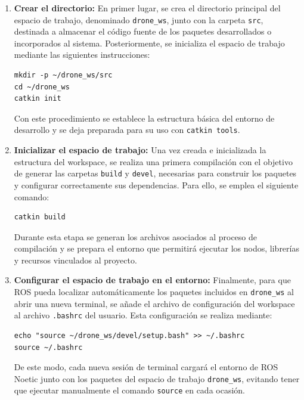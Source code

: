 \begin{enumerate}
    \item \textbf{Crear el directorio:} En primer lugar, se crea el directorio principal del espacio de trabajo, denominado \texttt{drone\_ws}, junto con la carpeta \texttt{src}, destinada a almacenar el código fuente de los paquetes desarrollados o incorporados al sistema. Posteriormente, se inicializa el espacio de trabajo mediante las siguientes instrucciones:

\begin{verbatim}
mkdir -p ~/drone_ws/src
cd ~/drone_ws
catkin init
\end{verbatim}

    Con este procedimiento se establece la estructura básica del entorno de desarrollo y se deja preparada para su uso con \texttt{catkin tools}.

    \item \textbf{Inicializar el espacio de trabajo:} Una vez creada e inicializada la estructura del workspace, se realiza una primera compilación con el objetivo de generar las carpetas \texttt{build} y \texttt{devel}, necesarias para construir los paquetes y configurar correctamente sus dependencias. Para ello, se emplea el siguiente comando:

\begin{verbatim}
catkin build
\end{verbatim}

    Durante esta etapa se generan los archivos asociados al proceso de compilación y se prepara el entorno que permitirá ejecutar los nodos, librerías y recursos vinculados al proyecto.

    \item \textbf{Configurar el espacio de trabajo en el entorno:} Finalmente, para que ROS pueda localizar automáticamente los paquetes incluidos en \texttt{drone\_ws} al abrir una nueva terminal, se añade el archivo de configuración del workspace al archivo \texttt{.bashrc} del usuario. Esta configuración se realiza mediante:

\begin{verbatim}
echo "source ~/drone_ws/devel/setup.bash" >> ~/.bashrc
source ~/.bashrc
\end{verbatim}

    De este modo, cada nueva sesión de terminal cargará el entorno de ROS Noetic junto con los paquetes del espacio de trabajo \texttt{drone\_ws}, evitando tener que ejecutar manualmente el comando \texttt{source} en cada ocasión.

\end{enumerate}



